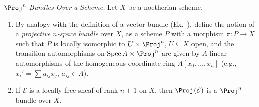 {{\begin{description}[style=multiline,labelwidth=2.6em,leftmargin=2.9em,itemsep=2pt,topsep=0pt,parsep=0pt]
\begin{enumerate}[label=\normalfont(\alph*),leftmargin=1.48em,itemsep=0pt,topsep=0pt,parsep=0pt]
\end{enumerate}
\item[\hypertarget{ex-II-7.10}{}7.10.] \emph{$\Proj^n$-Bundles Over a Scheme.} Let $X$ be a noetherian scheme.
\begin{enumerate}[label=\normalfont(\alph*),leftmargin=1.48em,itemsep=0pt,topsep=0pt,parsep=0pt]
\item By analogy with the definition of a vector bundle (Ex.~), define the notion of a \emph{projective $n$-space bundle} over $X$, as a scheme $P$ with a morphism $\pi\colon P\to X$ such that $P$ is locally isomorphic to $U\times\Proj^n$, $U\subseteq X$ open, and the transition automorphisms on $\operatorname{Spec}A\times\Proj^n$ are given by $A$-linear automorphisms of the homogeneous coordinate ring $A[x_0,\ldots,x_n]$ (e.g., $x_i'=\sum a_{ij}x_j$, $a_{ij}\in A$).
\item If $\mathcal E$ is a locally free sheaf of rank $n+1$ on $X$, then $\Proj(\mathcal E)$ is a $\Proj^n$-bundle over $X$.
\end{enumerate}
\end{description}
}
}
